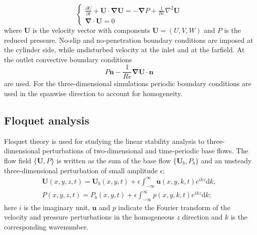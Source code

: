 \documentclass[onecolumn,notitlepage,superscriptaddress, amsmath,amssymb,longbibliographyaps,floatfix]{revtex4-1}
\begin{document}
\begin{equation}
\begin{cases}
\frac{\partial U}{\partial t} + \bm{U} \cdot \bm{\nabla}\bm{U} = - \bm{\nabla} P + \frac{1}{Re} \nabla^2 \bm{U} \\
\bm{\nabla} \cdot \bm{U} = 0
\end{cases}
\label{eq:NSequations}
\end{equation}
%
where $\bm{U}$ is the velocity vector with components $\bm{U}=(U,V,W)$ and $P$ is the reduced pressure. No-slip and no-penetration boundary conditions are imposed at the cylinder side, while undisturbed velocity at the inlet and at the farfield. At the outlet convective boundary conditions
% 
\begin{equation*}
P \bm{n} - \frac{1}{Re} \bm{\nabla} \bm{U} \cdot \bm{n}
\end{equation*}
%
are used. For the three-dimensional simulations periodic boundary conditions are used in the spanwise direction to account for homogeneity.

\subsection{Floquet analysis}

Floquet theory is used for studying the linear stability analysis to three-dimensional perturbations of two-dimensional and time-periodic base flows. The flow field $\{\bm{U},P\}$ is written as the sum of the base flow $\{\bm{U}_b,P_b\}$ and an unsteady three-dimensional perturbation of small amplitude $\epsilon$:
\begin{equation}
\begin{gathered}
\bm{U}(x,y,z,t)=\bm{U}_b(x,y,t) + \epsilon \int_{-\infty}^{\infty} \bm{u}(x,y,k,t)e^{ikz} \text{d}k, \\
    P (x,y,z,t)=    P _b(x,y,t) + \epsilon \int_{-\infty}^{\infty}     p (x,y,k,t)e^{ikz} \text{d}k;
\end{gathered}
\end{equation}
here $i$ is the imaginary unit, $\bm{u}$ and $p$ indicate the Fourier transform of the velocity and pressure perturbations in the homogeneous $z$ direction and $k$ is the corresponding wavenumber.
\end{document}
